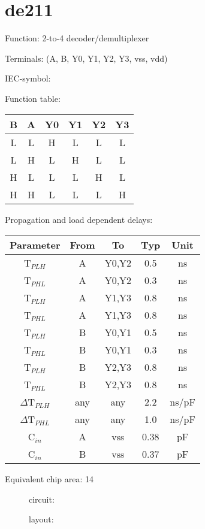 \section{de211}

Function: 2-to-4 decoder/demultiplexer

Terminals: (A, B, Y0, Y1, Y2, Y3, vss, vdd)


IEC-symbol:
\begin{figure}[bth]
\end{figure}

Function table:
\begin{table}[bth]
\begin{tabular}{|cc||cccc|}
\hline
B	&A	&Y0	&Y1	&Y2	&Y3\\
\hline
L	&L	&H	&L	&L	&L\\
L	&H	&L	&H	&L	&L\\
H	&L	&L	&L	&H	&L\\
H	&H	&L	&L	&L	&H\\	
\hline
\end{tabular}
\vspace{1cm}


Propagation and load dependent delays:\\

\begin{tabular}{|c|c|c|c|c|}
\hline
Parameter               &From            &To   &Typ    &Unit\\
\hline
T$_{PLH}$               &A     		&Y0,Y2  &0.5    &ns\\
T$_{PHL}$               &A     		&Y0,Y2  &0.3    &ns\\
T$_{PLH}$               &A     		&Y1,Y3  &0.8    &ns\\
T$_{PHL}$               &A     		&Y1,Y3  &0.8    &ns\\
T$_{PLH}$               &B	    	&Y0,Y1  &0.5    &ns\\
T$_{PHL}$               &B	    	&Y0,Y1  &0.3    &ns\\
T$_{PLH}$               &B	    	&Y2,Y3  &0.8    &ns\\
T$_{PHL}$               &B	    	&Y2,Y3  &0.8    &ns\\
\hline
$\Delta$T$_{PLH}$       &any           &any   &2.2    &ns/pF\\
$\Delta$T$_{PHL}$       &any           &any   &1.0    &ns/pF\\
\hline
C$_{in}$                &A   		&vss    &0.38   &pF\\
C$_{in}$                &B             	&vss    &0.37   &pF\\
\hline
\end{tabular}
\end{table}

Equivalent chip area: 14

\begin{figure}[bth]
circuit:\\

\end{figure}

\begin{figure}[bth]
layout:\\

\end{figure}

\clearpage
